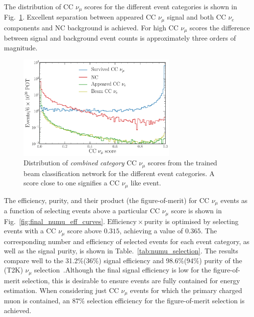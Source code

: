 The distribution of CC $\nu_{\mu}$ scores for the different event categories is shown in
Fig.~\ref{fig:final_beam_numu_outputs}. Excellent separation between appeared CC $\nu_{\mu}$
signal and both CC $\nu_{e}$ components and NC background is achieved. For high CC $\nu_{\mu}$
scores the difference between signal and background event counts is approximately three orders of
magnitude.

\begin{figure} %
    \includegraphics[width=0.7\textwidth]{diagrams/7-results/final_beam_numu_outputs.pdf}
    \caption[Distribution of CC $\nu_{\mu}$ scores from the trained beam classification network]
    {Distribution of \emph{combined category} CC $\nu_{\mu}$ scores from the trained beam
        classification network for the different event categories. A score close to one signifies
        a CC $\nu_{\mu}$ like event.}
    \label{fig:final_beam_numu_outputs}
\end{figure}

The efficiency, purity, and their product (the figure-of-merit) for CC $\nu_{\mu}$ events as a
function of selecting events above a particular CC $\nu_{\mu}$ score is shown in
Fig.~\ref{fig:final_numu_eff_curves}. $\mathrm{Efficiency}\times\mathrm{purity}$ is optimised by
selecting events with a CC $\nu_{\mu}$ score above $0.315$, achieving a value of $0.365$. The
corresponding number and efficiency of selected events for each event category, as well as the
signal purity, is shown in Table.~\ref{tab:numu_selection}. The results compare well to the
31.2\%(36\%) signal efficiency and 98.6\%(94\%) purity of the \nova(T2K) $\nu_{\mu}$
selection~\cite{acero2019, abe2015}.Although the final signal efficiency is low for the
figure-of-merit selection, this is desirable to ensure events are fully contained for energy
estimation. When considering just CC $\nu_{\mu}$ events for which the primary charged muon is
contained, an 87\% selection efficiency for the figure-of-merit selection is achieved.

